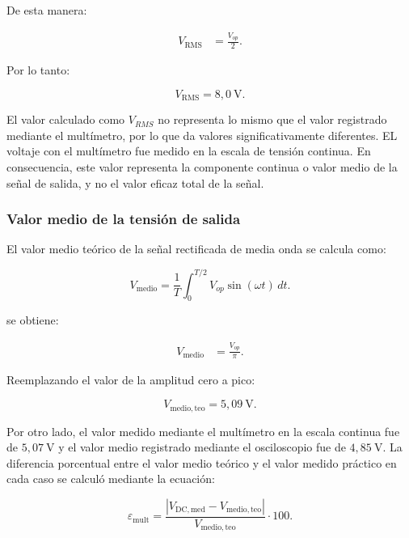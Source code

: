 De esta manera:

\begin{align*}
    V_{\mathrm{RMS}}
    &=
    \frac{V_{op}}{2}.
\end{align*}

Por lo tanto:

\begin{equation}
    \boxed{V_{\mathrm{RMS}}=8{,}0\ \mathrm{V}}.
\end{equation}

El valor calculado como $V_{RMS}$ no representa lo mismo que el valor registrado mediante el multímetro, por lo que da valores significativamente diferentes. EL voltaje con el multímetro fue medido en la escala de tensión continua. En consecuencia, este valor representa la componente continua o valor medio de la señal de salida, y no el valor eficaz total de la señal.

\subsubsection{Valor medio de la tensión de salida}

El valor medio teórico de la señal rectificada de media onda se calcula
como:

\begin{equation}
    V_{\mathrm{medio}}
    =
    \frac{1}{T}
    \int_0^{T/2}
    V_{op}\sin(\omega t)\,dt.
\end{equation}

se obtiene:

\begin{align*}
    V_{\mathrm{medio}}
    &=
    \frac{V_{op}}{\pi}.
\end{align*}

Reemplazando el valor de la amplitud cero a pico:

\begin{equation}
    \boxed{V_{\mathrm{medio,teo}}=5{,}09\ \mathrm{V}}.
\end{equation}

Por otro lado, el valor medido mediante el multímetro en la escala continua fue de $5{,}07 \ \mathrm{V}$ y el valor medio registrado mediante el osciloscopio fue de $4{,}85\ \mathrm{V}$. La diferencia porcentual entre el valor medio teórico y el valor medido práctico en cada caso se calculó mediante la ecuación:

\begin{equation}
    \varepsilon_{\mathrm{mult}}
    =
    \frac{
        \left|
        V_{\mathrm{DC,med}}-V_{\mathrm{medio,teo}}
        \right|
    }{
        V_{\mathrm{medio,teo}}
    }
    \cdot100.
\end{equation}

